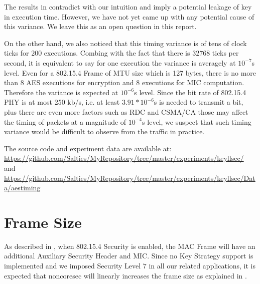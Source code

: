 The results in  contradict with our intuition and imply a potential leakage of key in execution time. However, we have not yet came up with any potential cause of this variance. We leave this as an open question in this report.

On the other hand, we also noticed that this timing variance is of tens of clock ticks for $200$ executions. Combing with the fact that there is $32768$ ticks per second, it is equivalent to say for one execution the variance is averagely at $10^{-7}$s level. Even for a 802.15.4 Frame of MTU size which is 127 bytes, there is no more than $8$ AES executions for encryption and $8$ executions for MIC computation. Therefore the variance is expected at $10 ^ {-6}$s level. Since the bit rate of 802.15.4 PHY is at most 250 kb/s\cite{802154}, i.e. at least $3.91 * 10^{-6}$s is needed to transmit a bit, plus there are even more factors such as RDC and CSMA/CA those may affect the timing of packets at a magnitude of $10^{-4}$s level, we suspect that such timing variance would be difficult to observe from the traffic in practice.

The source code and experiment data are available at:\\
\url{https://github.com/Salties/MyRepository/tree/master/experiments/keyllsec/} \\
and \\
\url{https://github.com/Salties/MyRepository/tree/master/experiments/keyllsec/Data/aestiming}

%
%

\section{Frame Size} \label{noncoresec frame size}

As described in , when 802.15.4 Security is enabled, the MAC Frame will have an additional Auxiliary Security Header and MIC. Since no Key Strategy support is implemented and we imposed Security Level $7$ in all our related applications, it is expected that noncoresec will linearly increases the frame size as explained in .

